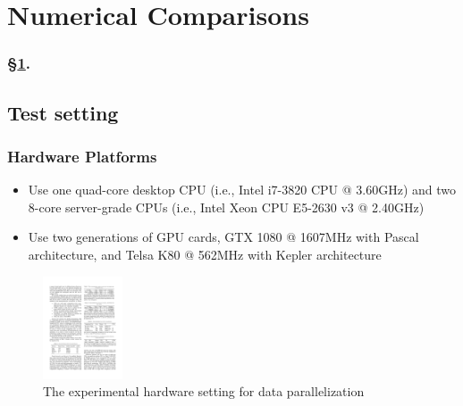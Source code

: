 
\section{Numerical Comparisons}\label{sec:numer}


\frameinlbffalse

\begin{frame}[plain]
\frametitle{\S\ref{sec:numer}. \insertsection}
\listofframes
\end{frame}
\addtocounter{framenumber}{-1} %

\frameinlbftrue


\subsection{Test setting}

\begin{frame}
	\MyLogo
	\frametitle{Hardware Platforms}  

\begin{itemize}

\item Use one quad-core desktop CPU (i.e., Intel i7-3820 CPU
		@ 3.60GHz) and two 8-core server-grade CPUs (i.e., Intel
		Xeon CPU E5-2630 v3 @ 2.40GHz)
		
\item Use two generations of GPU cards, GTX 1080 @ 1607MHz with
		Pascal architecture, and Telsa K80 @ 562MHz with Kepler
		architecture 
	\end{itemize}
	
\begin{figure}[htbp] 
	\includegraphics[height=1.2in]{figures/platforms.pdf} 
	\caption{The experimental hardware setting for data parallelization}
\end{figure}
	

\end{frame}



